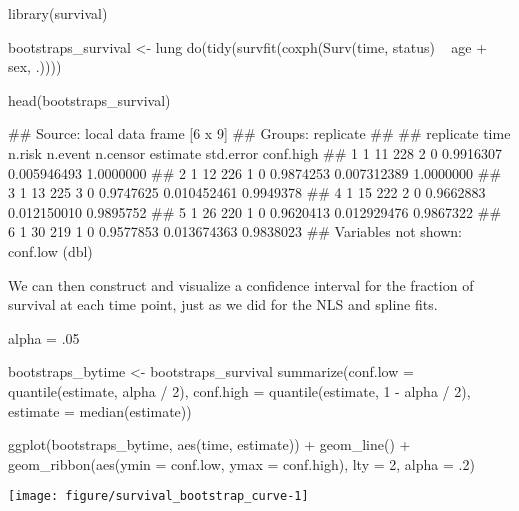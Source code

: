 \begin{example}
library(survival)
\end{example}

\begin{example}
bootstraps_survival <- lung %
    do(tidy(survfit(coxph(Surv(time, status) ~ age + sex, .))))
\end{example}

\begin{example}
head(bootstraps_survival)
\end{example}

\begin{example}
## Source: local data frame [6 x 9]
## Groups: replicate
## 
##   replicate time n.risk n.event n.censor  estimate   std.error conf.high
## 1         1   11    228       2        0 0.9916307 0.005946493 1.0000000
## 2         1   12    226       1        0 0.9874253 0.007312389 1.0000000
## 3         1   13    225       3        0 0.9747625 0.010452461 0.9949378
## 4         1   15    222       2        0 0.9662883 0.012150010 0.9895752
## 5         1   26    220       1        0 0.9620413 0.012929476 0.9867322
## 6         1   30    219       1        0 0.9577853 0.013674363 0.9838023
## Variables not shown: conf.low (dbl)

\end{example}


We can then construct and visualize a confidence interval for the fraction of survival at each time point, just as we did for the NLS and spline fits.

\begin{center}

\begin{example}
alpha = .05
\end{example}

\begin{example}
bootstraps_bytime <- bootstraps_survival %
    summarize(conf.low = quantile(estimate, alpha / 2),
              conf.high = quantile(estimate, 1 - alpha / 2),
              estimate = median(estimate))
\end{example}

\begin{example}

\end{example}

\begin{example}
ggplot(bootstraps_bytime, aes(time, estimate)) +
    geom_line() +
    geom_ribbon(aes(ymin = conf.low, ymax = conf.high), lty = 2, alpha = .2)
\end{example}

\texttt{[image: figure/survival\_bootstrap\_curve-1]} 
\end{center}

